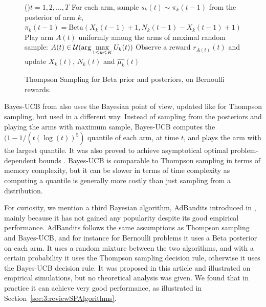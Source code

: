\begin{figure}[h!]
	\centering
    \begin{framed}
	\begin{algorithm}[H]
		\For(){$t = 1, 2, \dots, T$}{
            For each arm, sample $s_k(t) \sim \pi_k(t-1)$ from the posterior of arm $k$, $\pi_k(t-1)=\mathrm{Beta}(X_k(t-1)+1,N_k(t-1)-X_k(t-1)+1)$\;
            Play arm $A(t)$ uniformly among the arms of maximal random sample: $A(t) \in \mathcal{U}(\arg\max\limits_{1\leq k \leq K} U_k(t))$\;
            Observe a reward $r_{A(t)}(t)$ and update $X_k(t)$, $N_k(t)$ and $\widehat{\mu_k}(t)$\;
		}
		\caption{Thompson Sampling for Beta prior and posteriors, on Bernoulli rewards.}
		\label{algo:2:ThompsonSampling}
	\end{algorithm}
	\end{framed}
\end{figure}


Bayes-UCB from \cite{Kaufmann12BUCB} also uses the Bayesian point of view, updated like for Thompson sampling, but used in a different way.
Instead of sampling from the posteriors and playing the arms with maximum sample, Bayes-UCB computes the $(1-1/(t (\log(t))^5)$ quantile of each arm, at time $t$, and plays the arm with the largest quantile.
It was also proved to achieve asymptotical optimal problem-dependent bounds \cite{Kaufmann12BUCB}.
%
Bayes-UCB is comparable to Thompson sampling in terms of memory complexity, but it can be slower in terms of time complexity as computing a quantile is generally more costly than just sampling from a distribution.

For curiosity, we mention a third Bayesian algorithm, AdBandits introduced in \cite{Truzzi13}, mainly because it has not gained any popularity despite its good empirical performance.
AdBandits follows the same assumptions as Thompson sampling and Bayes-UCB, and for instance for Bernoulli problems it uses a Beta posterior on each arm.
It uses a random mixture between the two algorithms, and with a certain probability it uses the Thompson sampling decision rule, otherwise it uses the Bayes-UCB decision rule.
It was proposed in this article \cite{Truzzi13} and illustrated on empirical simulations, but no theoretical analysis was given.
We found that in practice it can achieve very good performance, as illustrated in Section~\ref{sec:3:reviewSPAlgorithms}.

